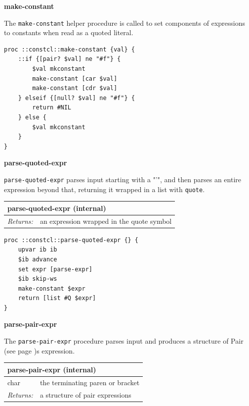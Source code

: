 \documentclass[twoside,9pt]{report}
\begin{document}
\textbf{make-constant}


The \texttt{make-constant} helper procedure is called to set components of expressions to constants when read as a quoted literal.

\noindent\makebox[\linewidth]{\rule{\linewidth}{0.4pt}}
\begin{lstlisting}
proc ::constcl::make-constant {val} {
    ::if {[pair? $val] ne "#f"} {
        $val mkconstant
        make-constant [car $val]
        make-constant [cdr $val]
    } elseif {[null? $val] ne "#f"} {
        return #NIL
    } else {
        $val mkconstant
    }
}
\end{lstlisting}
\noindent\makebox[\linewidth]{\rule{\linewidth}{0.4pt}}

\textbf{parse-quoted-expr}


\texttt{parse-quoted-expr} parses input starting with a "'", and then parses an entire expression beyond that, returning it wrapped in a list with \texttt{quote}.

\begin{tabular}{ |l l| }
\hline
\multicolumn{2}{|l|}{parse-quoted-expr (internal)} \\
\hline
\textit{Returns:} & an expression wrapped in the quote symbol \\
\hline
\end{tabular}

\noindent\makebox[\linewidth]{\rule{\linewidth}{0.4pt}}
\begin{lstlisting}
proc ::constcl::parse-quoted-expr {} {
    upvar ib ib
    $ib advance
    set expr [parse-expr]
    $ib skip-ws
    make-constant $expr
    return [list #Q $expr]
}
\end{lstlisting}
\noindent\makebox[\linewidth]{\rule{\linewidth}{0.4pt}}

\textbf{parse-pair-expr}


The \texttt{parse-pair-expr} procedure parses input and produces a structure of Pair (see page \pageref{pairs-and-lists})s expression.

\begin{tabular}{ |l l| }
\hline
\multicolumn{2}{|l|}{parse-pair-expr (internal)} \\
\hline
char & the terminating paren or bracket \\
\textit{Returns:} & a structure of pair expressions \\
\hline
\end{tabular}
\end{document}
